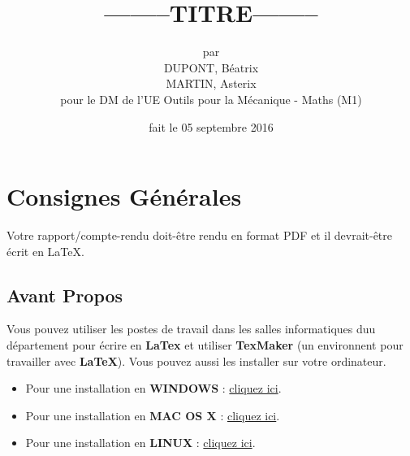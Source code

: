 \documentclass[a4paper,10pt]{report} %
\title{--------TITRE--------} %
\author{par\\DUPONT, Béatrix\\ MARTIN, Asterix\\pour le DM de l'UE Outils pour la Mécanique - Maths (M1)} %
\date{fait le 05 septembre 2016} %
\begin{document}
\maketitle %
\tableofcontents %
\listoffigures %













\chapter{Consignes Générales} %
Votre rapport/compte-rendu doit-être rendu en format PDF et il devrait-être écrit en LaTeX.
















\section{Avant Propos} %
\label{sec:AP} %
Vous pouvez utiliser les postes de travail dans les salles informatiques duu département pour écrire en \textbf{LaTex} et utiliser \textbf{TexMaker} (un environnent pour travailler avec \textbf{LaTeX}). Vous pouvez aussi les installer sur votre ordinateur.
\begin{itemize} %
\renewcommand{\labelitemi}{$\circ$}
	\item Pour une installation en \textbf{WINDOWS} : \href{http://www.howtotex.com/howto/installing-latex-on-windows/}{cliquez ici}.
	
	\item Pour une installation en \textbf{MAC OS X} : \href{http://www.howtotex.com/howto/installing-latex-on-mac-os-x/}{cliquez ici}.
	
	\item Pour une installation en \textbf{LINUX} : \href{http://www.howtotex.com/howto/installing-latex-on-mac-os-x/}{cliquez ici}.
\end{itemize}
\end{document}
